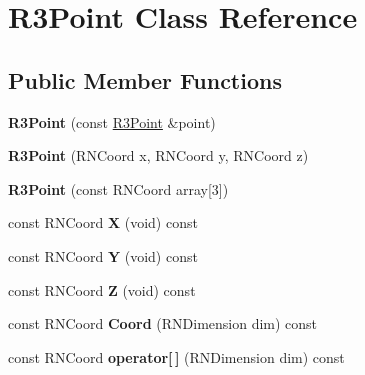 \hypertarget{class_r3_point}{}\section{R3\+Point Class Reference}
\label{class_r3_point}
\subsection*{Public Member Functions}
\begin{DoxyCompactItemize}
\item 
{\bfseries R3\+Point} (const \hyperlink{class_r3_point}{R3\+Point} \&point)\hypertarget{class_r3_point_aeff2b2af8ead9ac23b39975e04f9617c}{}\label{class_r3_point_aeff2b2af8ead9ac23b39975e04f9617c}

\item 
{\bfseries R3\+Point} (R\+N\+Coord x, R\+N\+Coord y, R\+N\+Coord z)\hypertarget{class_r3_point_a7099143466996c64b7a8bcbd21534cf8}{}\label{class_r3_point_a7099143466996c64b7a8bcbd21534cf8}

\item 
{\bfseries R3\+Point} (const R\+N\+Coord array\mbox{[}3\mbox{]})\hypertarget{class_r3_point_a69f6257fc99a2ce28ed45bf540d8a6d0}{}\label{class_r3_point_a69f6257fc99a2ce28ed45bf540d8a6d0}

\item 
const R\+N\+Coord {\bfseries X} (void) const \hypertarget{class_r3_point_a1b8f6f4c3205423494a4552635e4272e}{}\label{class_r3_point_a1b8f6f4c3205423494a4552635e4272e}

\item 
const R\+N\+Coord {\bfseries Y} (void) const \hypertarget{class_r3_point_a43d786c38e150a4659272967df806435}{}\label{class_r3_point_a43d786c38e150a4659272967df806435}

\item 
const R\+N\+Coord {\bfseries Z} (void) const \hypertarget{class_r3_point_a98c2eb4a1bb2fc05660320dbb8c57b77}{}\label{class_r3_point_a98c2eb4a1bb2fc05660320dbb8c57b77}

\item 
const R\+N\+Coord {\bfseries Coord} (R\+N\+Dimension dim) const \hypertarget{class_r3_point_a05e0b1e436a8cd217dd3f91fb704c2f0}{}\label{class_r3_point_a05e0b1e436a8cd217dd3f91fb704c2f0}

\item 
const R\+N\+Coord {\bfseries operator\mbox{[}$\,$\mbox{]}} (R\+N\+Dimension dim) const \hypertarget{class_r3_point_ad5374304ae38adc2f8249cd490ea244b}{}\label{class_r3_point_ad5374304ae38adc2f8249cd490ea244b}


\end{DoxyCompactItemize}
